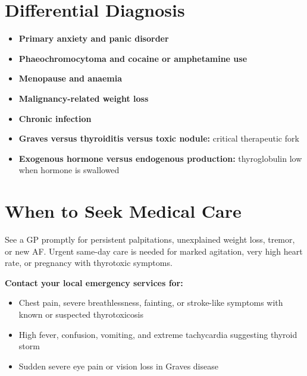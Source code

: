 \section*{Differential Diagnosis}
\begin{itemize}
    \item \textbf{Primary anxiety and panic disorder}
    \item \textbf{Phaeochromocytoma and cocaine or amphetamine use}
    \item \textbf{Menopause and anaemia}
    \item \textbf{Malignancy-related weight loss}
    \item \textbf{Chronic infection}
    \item \textbf{Graves versus thyroiditis versus toxic nodule:} critical therapeutic fork
    \item \textbf{Exogenous hormone versus endogenous production:} thyroglobulin low when hormone is swallowed
\end{itemize}

\section*{When to Seek Medical Care}
See a GP promptly for persistent palpitations, unexplained weight loss, tremor, or new AF. Urgent same-day care is needed for marked agitation, very high heart rate, or pregnancy with thyrotoxic symptoms.

\textbf{Contact your local emergency services for:}
\begin{itemize}
    \item Chest pain, severe breathlessness, fainting, or stroke-like symptoms with known or suspected thyrotoxicosis
    \item High fever, confusion, vomiting, and extreme tachycardia suggesting thyroid storm
    \item Sudden severe eye pain or vision loss in Graves disease
\end{itemize}

